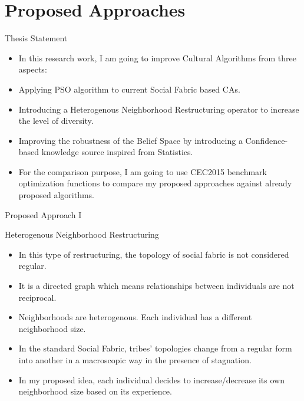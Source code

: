 \documentclass[table]{beamer}
\begin{document}
	\section{Proposed Approaches}
	
	\begin{frame}{Thesis Statement}
		\begin{block}{}
			\begin{itemize}
				\justifying			
				\item In this research work, I am going to improve Cultural Algorithms from three aspects:
				\item Applying PSO algorithm to current Social Fabric based CAs.
				\item Introducing a Heterogenous Neighborhood Restructuring operator to increase the level of diversity.
				\item Improving the robustness of the Belief Space by introducing a Confidence-based knowledge source inspired from Statistics.
				\item For the comparison purpose, I am going to use CEC2015 benchmark optimization functions to compare my proposed approaches against already proposed algorithms.
			\end{itemize}
		\end{block}
	\end{frame}
		
	\begin{frame}{Proposed Approach I}
		\begin{block}{Heterogenous Neighborhood Restructuring}
			\begin{itemize}
				\item In this type of restructuring, the topology of social fabric is not considered regular.
				\item It is a directed graph which means relationships between individuals are not reciprocal.
				\item Neighborhoods are \alert{heterogenous}. Each individual has a different neighborhood size.
				\item In the standard Social Fabric, tribes' topologies change from a regular form into another in a macroscopic way in the presence of stagnation.
				\item In my proposed idea, each individual decides to increase/decrease its own neighborhood size based on its experience.
			\end{itemize}
		\end{block}
	\end{frame}
	
\end{document}
